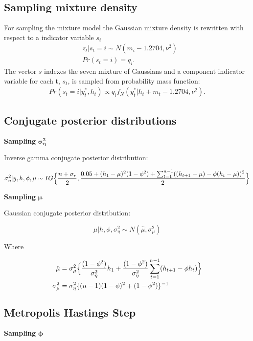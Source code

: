 \documentclass[12pt, a4paper]{article}
\begin{document}
    \subsection*{Sampling mixture density}
    For sampling the mixture model the Gaussian mixture density is rewritten with respect to a indicator variable $s_t$
        \begin{align}
        &z_t | s_t = i \sim N(m_i - 1.2704, \nu^2) \\
        &Pr(s_t = i) = q_i.
        \end{align}
        The vector $s$ indexes the seven mixture of Gaussians and a component indicator variable for each t, $s_t$, is sampled from probability mass function: 
        \begin{align}
        Pr(s_t = i | y_t^{\ast}, h_t) \propto q_i f_N(y_t^{\ast} | h_t + m_t - 1.2704, \nu^2).
        \end{align}



\subsection*{Conjugate posterior distributions}

\textbf{Sampling} $\boldsymbol{\sigma_{\eta}^2}$

Inverse gamma conjugate posterior distribution:

$$
\sigma^2_{\eta} | y,h,\phi,\mu \sim IG \Bigl\{\frac{n+\sigma_r}{2}, \frac{0.05 + (h_1 - \mu)^2 (1 - \phi^2) + \sum_{t=1}^{n-1}((h_{t+1} - \mu) - \phi(h_t - \mu))^2}{2}\Bigr\}
$$

\textbf{Sampling}  $\boldsymbol{\mu}$

Gaussian conjugate posterior distribution:

$$
\mu | h,\phi,\sigma^2_{\eta}  \sim N(\hat{\mu}, \sigma^2_{\mu})
$$

Where

$$
\begin{aligned}
\hat{\mu} &= \sigma^2_{\mu} \Bigl\{\frac{(1-\phi^2)}{\sigma_{\eta}^2}h_1 +\frac{(1-\phi^2)}{\sigma_{\eta}^2} \sum_{t=1}^{n-1} (h_{t+1} - \phi h_t)\Bigr\} \\
\sigma^2_{\mu} &= \sigma^2_{\eta} \{(n-1)(1-\phi)^2 + (1-\phi^2)\}^{-1}
\end{aligned}
$$

\subsection*{Metropolis Hastings Step}
\textbf{Sampling}  $\boldsymbol{\phi}$
\end{document}

